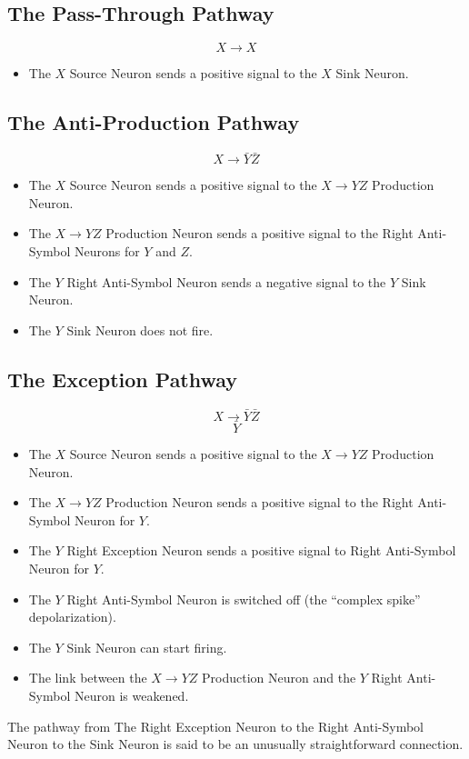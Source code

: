 \documentclass{article}
\begin{document}
\subsection{The Pass-Through Pathway}

$$X \to X$$

\begin{itemize}
\item The $X$ Source Neuron sends a positive signal to the $X$ Sink Neuron.
\end{itemize}

\subsection{The Anti-Production Pathway}

$$ X \to \bar{Y} \bar{Z} $$

\begin{itemize}
\item The $X$ Source Neuron sends a positive signal to the $X\to YZ$
  Production Neuron.
\item The $X\to YZ$ Production Neuron sends a positive signal to
  the Right Anti-Symbol Neurons for $Y$ and $Z$.
\item The $Y$ Right Anti-Symbol Neuron sends a negative signal to the
  $Y$ Sink Neuron.
\item The $Y$ Sink Neuron does not fire.
\end{itemize}

\subsection{The Exception Pathway}

$$ X\to \bar{Y} \bar{Z}$$
$$ \bar{Y} $$

\begin{itemize}
\item The $X$ Source Neuron sends a positive signal to the $X\to YZ$
  Production Neuron.
\item The $X\to YZ$ Production Neuron sends a positive signal to the
  Right Anti-Symbol Neuron for $Y$.
\item The $Y$ Right Exception Neuron sends a positive signal to Right
  Anti-Symbol Neuron for $Y$.
\item The $Y$ Right Anti-Symbol Neuron is switched off (the ``complex
  spike'' depolarization).
\item The $Y$ Sink Neuron can start firing. 
\item The link between the $X\to YZ$ Production Neuron and the $Y$
  Right Anti-Symbol Neuron is weakened.
\end{itemize}

The pathway from The Right Exception Neuron to the Right Anti-Symbol
Neuron to the Sink Neuron is said to be an unusually straightforward
connection.
\end{document}
